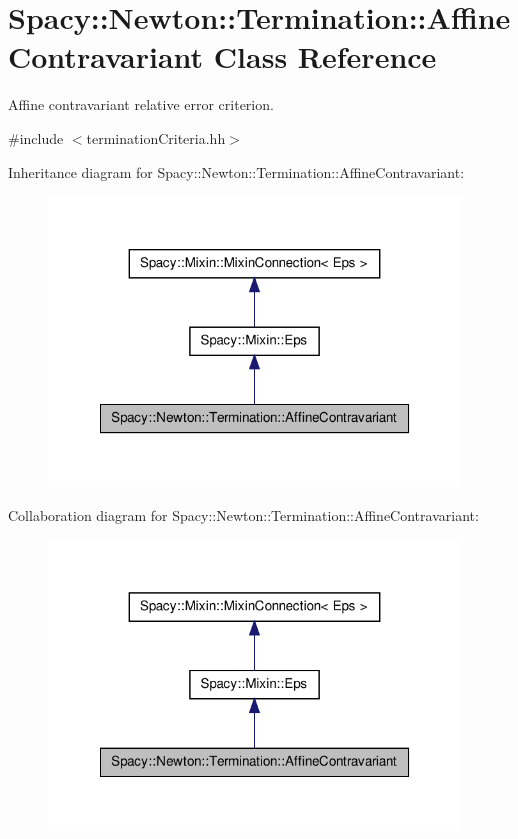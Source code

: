 \hypertarget{classSpacy_1_1Newton_1_1Termination_1_1AffineContravariant}{\section{\-Spacy\-:\-:\-Newton\-:\-:\-Termination\-:\-:\-Affine\-Contravariant \-Class \-Reference}
\label{classSpacy_1_1Newton_1_1Termination_1_1AffineContravariant}
}


\-Affine contravariant relative error criterion.  




{\ttfamily \#include $<$termination\-Criteria.\-hh$>$}



\-Inheritance diagram for \-Spacy\-:\-:\-Newton\-:\-:\-Termination\-:\-:\-Affine\-Contravariant\-:
\nopagebreak
\begin{figure}[H]
\begin{center}
\leavevmode
\includegraphics[width=310pt]{classSpacy_1_1Newton_1_1Termination_1_1AffineContravariant__inherit__graph}
\end{center}
\end{figure}


\-Collaboration diagram for \-Spacy\-:\-:\-Newton\-:\-:\-Termination\-:\-:\-Affine\-Contravariant\-:
\nopagebreak
\begin{figure}[H]
\begin{center}
\leavevmode
\includegraphics[width=310pt]{classSpacy_1_1Newton_1_1Termination_1_1AffineContravariant__coll__graph}
\end{center}
\end{figure}
